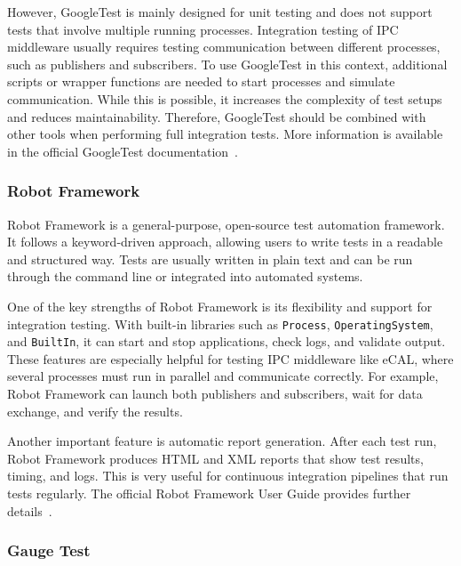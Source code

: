 \vspace{1em}
However, GoogleTest is mainly designed for unit testing and does not support tests that involve multiple running processes. Integration testing of IPC middleware usually requires testing communication between different processes, such as publishers and subscribers. To use GoogleTest in this context, additional scripts or wrapper functions are needed to start processes and simulate communication. While this is possible, it increases the complexity of test setups and reduces maintainability. Therefore, GoogleTest should be combined with other tools when performing full integration tests. More information is available in the official GoogleTest documentation~\cite{GoogleTestDocs}.

\subsubsection*{Robot Framework}

Robot Framework is a general-purpose, open-source test automation framework. It follows a keyword-driven approach, allowing users to write tests in a readable and structured way. Tests are usually written in plain text and can be run through the command line or integrated into automated systems.

\vspace{1em}
One of the key strengths of Robot Framework is its flexibility and support for integration testing. With built-in libraries such as \texttt{Process}, \texttt{OperatingSystem}, and \texttt{BuiltIn}, it can start and stop applications, check logs, and validate output. These features are especially helpful for testing IPC middleware like eCAL, where several processes must run in parallel and communicate correctly. For example, Robot Framework can launch both publishers and subscribers, wait for data exchange, and verify the results.

\vspace{1em}
Another important feature is automatic report generation. After each test run, Robot Framework produces HTML and XML reports that show test results, timing, and logs. This is very useful for continuous integration pipelines that run tests regularly. The official Robot Framework User Guide provides further details~\cite{RobotFrameworkDocs}.

\subsubsection*{Gauge Test}

